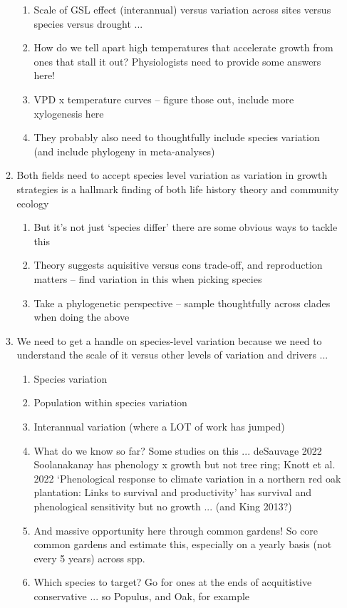 \documentclass[11pt,letter]{article}
\begin{document}
\begin{enumerate}
\begin{enumerate}
\begin{enumerate}
\item Scale of GSL effect (interannual) versus variation across sites versus species versus drought ... 
\item How do we tell apart high temperatures that accelerate growth from ones that stall it out? Physiologists need to provide some answers here! %
\item VPD x temperature curves -- figure those out, include more xylogenesis here
\item They probably also need to thoughtfully include species variation (and include phylogeny in meta-analyses)
\end{enumerate}
\item Both fields need to accept species level variation as variation in growth strategies is a hallmark finding of both life history theory and community ecology
\begin{enumerate}
\item But it's not just `species differ' there are some obvious ways to tackle this
\item Theory suggests aquisitive versus cons trade-off, and reproduction matters -- find variation in this when picking species
\item Take a phylogenetic perspective -- sample thoughtfully across clades when doing the above
\end{enumerate}
\item We need to get a handle on species-level variation because we need to understand the scale of it versus other levels of variation and drivers ... 
\begin{enumerate}
\item Species variation
\item Population within species variation 
\item Interannual variation (where a LOT of work has jumped)
\item What do we know so far? Some studies on this ... deSauvage 2022 Soolanakanay has phenology x growth but not tree ring; Knott et al. 2022 `Phenological response to climate variation in a northern red oak plantation: Links to survival and productivity' has survival and phenological sensitivity but no growth ...  (and King 2013?)
\item And massive opportunity here through common gardens! So core common gardens and estimate this, especially on a yearly basis (not every 5 years) across spp. 
\item Which species to target? Go for ones at the ends of acquitistive conservative ... so Populus, and Oak, for example

\end{enumerate}
\end{enumerate}
\end{enumerate}
\end{document}
